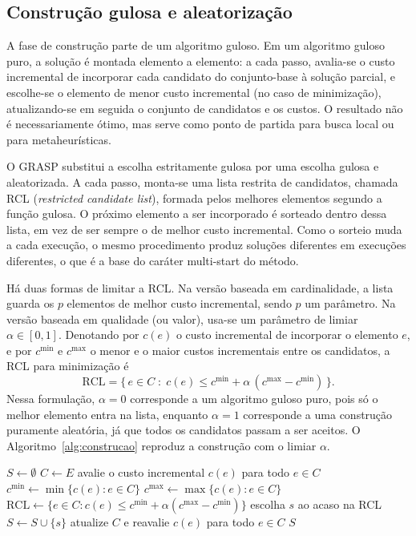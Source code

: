\documentclass[11pt,a4paper]{article}
\begin{document}
\subsection{Construção gulosa e aleatorização}

A fase de construção parte de um algoritmo guloso. Em um algoritmo guloso puro, a solução é montada elemento a elemento: a cada passo, avalia-se o custo incremental de incorporar cada candidato do conjunto-base à solução parcial, e escolhe-se o elemento de menor custo incremental (no caso de minimização), atualizando-se em seguida o conjunto de candidatos e os custos. O resultado não é necessariamente ótimo, mas serve como ponto de partida para busca local ou para metaheurísticas.

O GRASP substitui a escolha estritamente gulosa por uma escolha gulosa e aleatorizada. A cada passo, monta-se uma lista restrita de candidatos, chamada RCL (\emph{restricted candidate list}), formada pelos melhores elementos segundo a função gulosa. O próximo elemento a ser incorporado é sorteado dentro dessa lista, em vez de ser sempre o de melhor custo incremental. Como o sorteio muda a cada execução, o mesmo procedimento produz soluções diferentes em execuções diferentes, o que é a base do caráter multi-start do método.

Há duas formas de limitar a RCL. Na versão baseada em cardinalidade, a lista guarda os $p$ elementos de melhor custo incremental, sendo $p$ um parâmetro. Na versão baseada em qualidade (ou valor), usa-se um parâmetro de limiar $\alpha \in [0,1]$. Denotando por $c(e)$ o custo incremental de incorporar o elemento $e$, e por $c^{\min}$ e $c^{\max}$ o menor e o maior custos incrementais entre os candidatos, a RCL para minimização é
\begin{equation}
\text{RCL} = \{\, e \in C \;:\; c(e) \le c^{\min} + \alpha\,(c^{\max} - c^{\min}) \,\}.
\label{eq:rcl-min}
\end{equation}
Nessa formulação, $\alpha = 0$ corresponde a um algoritmo guloso puro, pois só o melhor elemento entra na lista, enquanto $\alpha = 1$ corresponde a uma construção puramente aleatória, já que todos os candidatos passam a ser aceitos. O Algoritmo~\ref{alg:construcao} reproduz a construção com o limiar $\alpha$.

\begin{algorithm}[t]
\caption{Construção gulosa e aleatorizada (minimização)}
\label{alg:construcao}
\begin{algorithmic}[1]
  \State $S \gets \emptyset$
  \State $C \gets E$ 
  \State avalie o custo incremental $c(e)$ para todo $e \in C$
    \State $c^{\min} \gets \min\{c(e) : e \in C\}$
    \State $c^{\max} \gets \max\{c(e) : e \in C\}$
    \State $\text{RCL} \gets \{ e \in C : c(e) \le c^{\min} + \alpha(c^{\max}-c^{\min}) \}$
    \State escolha $s$ ao acaso na RCL
    \State $S \gets S \cup \{s\}$
    \State atualize $C$ e reavalie $c(e)$ para todo $e \in C$
  \EndWhile
  \State \Return $S$
\EndProcedure
\end{algorithmic}
\end{algorithm}
\end{document}
